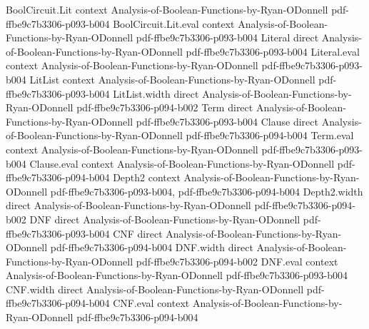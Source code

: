 \begin{lemma}
\label{BooleanAnalysis.chiS_mul_chiS}
\leanok
{}
\proofstep
  {BoolCircuit.Lit}
  {context}
  {Analysis-of-Boolean-Functions-by-Ryan-ODonnell}
  {pdf-ffbe9c7b3306-p093-b004}
\proofstep
  {BoolCircuit.Lit.eval}
  {context}
  {Analysis-of-Boolean-Functions-by-Ryan-ODonnell}
  {pdf-ffbe9c7b3306-p093-b004}
\proofstep
  {Literal}
  {direct}
  {Analysis-of-Boolean-Functions-by-Ryan-ODonnell}
  {pdf-ffbe9c7b3306-p093-b004}
\proofstep
  {Literal.eval}
  {context}
  {Analysis-of-Boolean-Functions-by-Ryan-ODonnell}
  {pdf-ffbe9c7b3306-p093-b004}
\proofstep
  {LitList}
  {context}
  {Analysis-of-Boolean-Functions-by-Ryan-ODonnell}
  {pdf-ffbe9c7b3306-p093-b004}
\proofstep
  {LitList.width}
  {direct}
  {Analysis-of-Boolean-Functions-by-Ryan-ODonnell}
  {pdf-ffbe9c7b3306-p094-b002}
\proofstep
  {Term}
  {direct}
  {Analysis-of-Boolean-Functions-by-Ryan-ODonnell}
  {pdf-ffbe9c7b3306-p093-b004}
\proofstep
  {Clause}
  {direct}
  {Analysis-of-Boolean-Functions-by-Ryan-ODonnell}
  {pdf-ffbe9c7b3306-p094-b004}
\proofstep
  {Term.eval}
  {context}
  {Analysis-of-Boolean-Functions-by-Ryan-ODonnell}
  {pdf-ffbe9c7b3306-p093-b004}
\proofstep
  {Clause.eval}
  {context}
  {Analysis-of-Boolean-Functions-by-Ryan-ODonnell}
  {pdf-ffbe9c7b3306-p094-b004}
\proofstep
  {Depth2}
  {context}
  {Analysis-of-Boolean-Functions-by-Ryan-ODonnell}
  {pdf-ffbe9c7b3306-p093-b004,
    pdf-ffbe9c7b3306-p094-b004}
\proofstep
  {Depth2.width}
  {direct}
  {Analysis-of-Boolean-Functions-by-Ryan-ODonnell}
  {pdf-ffbe9c7b3306-p094-b002}
\proofstep
  {DNF}
  {direct}
  {Analysis-of-Boolean-Functions-by-Ryan-ODonnell}
  {pdf-ffbe9c7b3306-p093-b004}
\proofstep
  {CNF}
  {direct}
  {Analysis-of-Boolean-Functions-by-Ryan-ODonnell}
  {pdf-ffbe9c7b3306-p094-b004}
\proofstep
  {DNF.width}
  {direct}
  {Analysis-of-Boolean-Functions-by-Ryan-ODonnell}
  {pdf-ffbe9c7b3306-p094-b002}
\proofstep
  {DNF.eval}
  {context}
  {Analysis-of-Boolean-Functions-by-Ryan-ODonnell}
  {pdf-ffbe9c7b3306-p093-b004}
\proofstep
  {CNF.width}
  {direct}
  {Analysis-of-Boolean-Functions-by-Ryan-ODonnell}
  {pdf-ffbe9c7b3306-p094-b004}
\proofstep
  {CNF.eval}
  {context}
  {Analysis-of-Boolean-Functions-by-Ryan-ODonnell}
  {pdf-ffbe9c7b3306-p094-b004}
\proofstep

\end{lemma}
